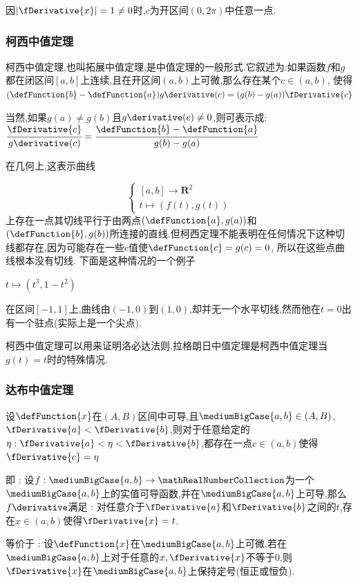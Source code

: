 {{{因$|\fDerivative{x}| = 1 \neq 0$时,$c$为开区间$(0,2\pi)$中任意一点.
}%

\subsubsection{柯西中值定理}{
  柯西中值定理,也叫拓展中值定理,是中值定理的一般形式.它叙述为:如果函数$f$和$g$都在闭区间$[a,b]$上连续,且在开区间$(a,b)$上可微,那么存在某个$c \in (a,b)$,
  使得$(\defFunction{b} - \defFunction{a})g\derivative(c) = (g(b)-g(a))\fDerivative{c}$

  当然,如果$g(a) \neq g(b)$且$g\derivative(c) \neq 0$,则可表示成:$\cfrac{\fDerivative{c}}{g\derivative(c)} = \cfrac{\defFunction{b} - \defFunction{a}}{g(b) - g(a)}$

  在几何上,这表示曲线

  $$
    \begin{cases}
      [a,b] \to \mathbf{R}^2 \\
      t \mapsto (f(t), g(t))
    \end{cases}
  $$
  上存在一点其切线平行于由两点$(\defFunction{a}, g(a))$和$(\defFunction{b}, g(b))$所连接的直线.但柯西定理不能表明在任何情况下这种切线都存在,因为可能存在一些c值使$\defFunction{c} = g(c) = 0$, 所以在这些点曲线根本没有切线.
  下面是这种情况的一个例子

  $t \mapsto (t^3, 1-t^2)$

  在区间$[-1,1]$上,曲线由$(-1, 0)$到$(1,0)$,却并无一个水平切线,然而他在$t = 0$出有一个驻点(实际上是一个尖点).

  柯西中值定理可以用来证明洛必达法则.拉格朗日中值定理是柯西中值定理当$g(t) = t$时的特殊情况.
}%

\subsubsection{达布中值定理}{
  设$\defFunction{x}$在$(A,B)$区间中可导,且$\mediumBigCase{a,b} \in (A,B)$,$\fDerivative{a} < \fDerivative{b}$,则对于任意给定的$\eta : \fDerivative{a} < \eta < \fDerivative{b}$,都存在一点$c \in (a,b)$使得$\fDerivative{c} = \eta$

  即 : 设$f : \mediumBigCase{a,b} \to \mathRealNumberCollection$为一个$\mediumBigCase{a,b}$上的实值可导函数,并在$\mediumBigCase{a,b}$上可导,那么$f\derivative$满足 : 对任意介于$\fDerivative{a}$和$\fDerivative{b}$之间的$t$,存在$x \in (a,b)$使得$\fDerivative{x} = t$.

  等价于 : 设$\defFunction{x}$在$\mediumBigCase{a,b}$上可微,若在$\mediumBigCase{a,b}$上对于任意的$x,\fDerivative{x}$不等于0,则$\fDerivative{x}$在$\mediumBigCase{a,b}$上保持定号(恒正或恒负).
}%

}}
